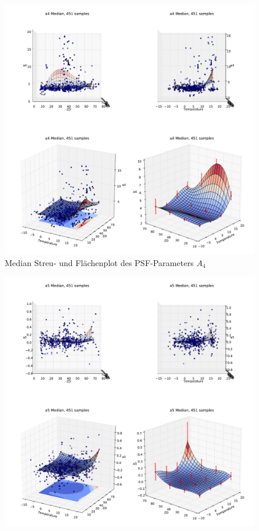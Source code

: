 \begin{appendix}
\begin{figure}[H]
	\centering
	\includegraphics[scale=.48]{psf_surf/a4_med.pdf}
	\caption[Median Streu- und Flächenplot des PSF-Parameters $A_4$]{Median Streu- und Flächenplot des PSF-Parameters $A_4$}
    \label{psf_surf_a4_med}
\end{figure}
\begin{figure}[H]
	\centering
	\includegraphics[scale=.48]{psf_surf/a5_med.pdf}

\end{figure}
\end{appendix}
